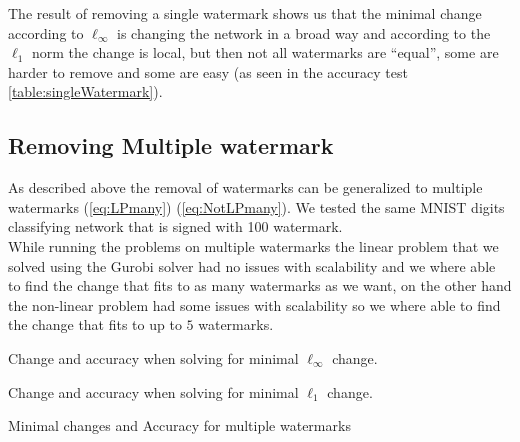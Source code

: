 \documentclass{easychair}
\begin{document}
The result of removing a single watermark shows us that the minimal change according to $\ell_\infty$ is changing the network in a broad way and according to the $\ell_1$ norm the change is local, but then not all watermarks are ``equal'', some are harder to remove and some are easy (as seen in the accuracy test \ref{table:singleWatermark}).

\subsection{Removing Multiple watermark}

As described above the removal of watermarks can be generalized to multiple watermarks (\ref{eq:LPmany}) (\ref{eq:NotLPmany}). We tested the same MNIST digits classifying network that is signed with 100 watermark.
\\
While running the problems on multiple watermarks the linear problem that we solved using the Gurobi solver had no issues with scalability and we where able to find the change that fits to as many watermarks as we want, on the other hand the non-linear problem had some issues with scalability so we where able to find the change that fits to up to $5$ watermarks.

\begin{table}
\begin{subtable}{1\textwidth}
\centering
{}
\caption{Change and accuracy when solving for minimal $\ell_\infty$ change.}
\end{subtable}
\begin{subtable}{1\textwidth}
\centering
{}
\caption{Change and accuracy when solving for minimal $\ell_1$ change.}
\end{subtable}
\caption{Minimal changes and Accuracy for multiple watermarks}
\label{table:multipleWatermarks}
\end{table}
\end{document}

